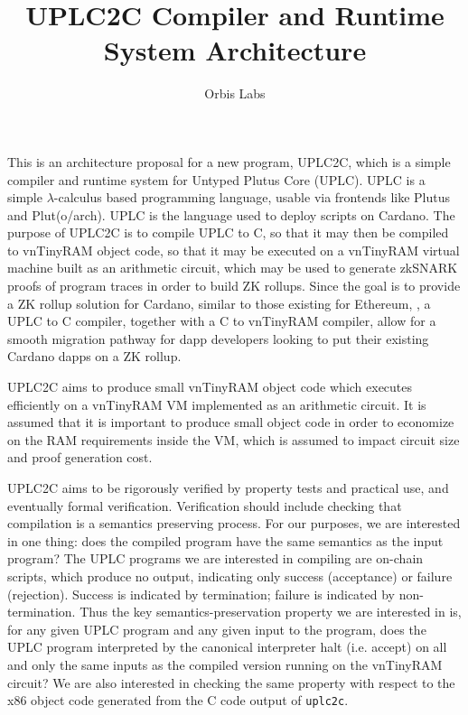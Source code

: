 \documentclass[12pt]{article}
\title{UPLC2C Compiler and Runtime System Architecture}
\author{Orbis Labs}
\begin{document}
\maketitle

This is an architecture proposal for a new program, UPLC2C, which is a simple compiler and runtime system for Untyped Plutus Core (UPLC). UPLC is a simple $\lambda$-calculus based programming language, usable via frontends like Plutus \cite{plutus} and Plut(o/arch). \cite{pluto,plutarch} UPLC is the language used to deploy scripts on Cardano. The purpose of UPLC2C is to compile UPLC to C, so that it may then be compiled to vnTinyRAM \cite{vntinyram} object code, so that it may be executed on a vnTinyRAM virtual machine built as an arithmetic circuit, which may be used to generate zkSNARK proofs of program traces in order to build ZK rollups. Since the goal is to provide a ZK rollup solution for Cardano, similar to those existing for Ethereum, \cite{ethworks-20}, a UPLC to C compiler, together with a C to vnTinyRAM compiler, allow for a smooth migration pathway for dapp developers looking to put their existing Cardano dapps on a ZK rollup.

UPLC2C aims to produce small vnTinyRAM object code which executes efficiently on a vnTinyRAM VM implemented as an arithmetic circuit. It is assumed that it is important to produce small object code in order to economize on the RAM requirements inside the VM, which is assumed to impact circuit size and proof generation cost. 

UPLC2C aims to be rigorously verified by property tests and practical use, and eventually formal verification. Verification should include checking that compilation is a semantics preserving process. For our purposes, we are interested in one thing: does the compiled program have the same semantics as the input program? The UPLC programs we are interested in compiling are on-chain scripts, which produce no output, indicating only success (acceptance) or failure (rejection). Success is indicated by termination; failure is indicated by non-termination. Thus the key semantics-preservation property we are interested in is, for any given UPLC program and any given input to the program, does the UPLC program interpreted by the canonical interpreter halt (i.e. accept) on all and only the same inputs as the compiled version running on the vnTinyRAM circuit? We are also interested in checking the same property with respect to the x86 object code generated from the C code output of \texttt{uplc2c}.
\end{document}
